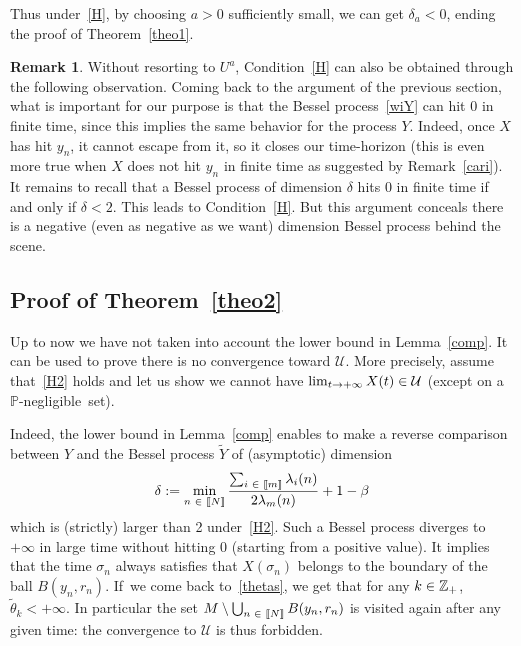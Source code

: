 \documentclass[10pt]{amsart}
\theoremstyle{definition}\newtheorem{defi}[theo]{Definition}\newtheorem{rema}[theo]{Remark}\newtheorem{exam}[theo]{Example}\newtheorem{exem}[theo]{Example}\newtheorem{nota}[theo]{Notation}
\newcommand{\f}[2]{\frac{#1}{#2}}
\newcommand{\cU}{\mathcal{U}}
\newcommand{\PP}{\mathbb{P}}
\newcommand{\ZZ}{\mathbb{Z}}
\newcommand{\iy}{\infty}
\newcommand{\wi}{\widetilde}
\let\oldin\in
\renewcommand{\in}{\mathchoice{\oldin}{\oldin}{\,\oldin\,}{\,\oldin\,}}
\renewcommand*{\to}{\mathchoice{\longrightarrow}{\rightarrow}{\rightarrow}{\rightarrow}}
\newcommand{\llbracket}{\mathopen{[\mkern -2.7mu[}}
\newcommand{\rrbracket}{\mathclose{]\mkern -2.7mu]}}
\newcommand{\lin}{\llbracket}
\newcommand{\rin}{\rrbracket}
\begin{document}
Thus under~\eqref{H}, by choosing $a>0$ sufficiently small, we can get $\delta_a<0$, ending the proof of Theorem~\ref{theo1}.



\begin{rema}
Without resorting to $U^a$, Condition~\eqref{H} can also be obtained through the following observation. Coming back to the argument of the previous section, what is important for our purpose is that the Bessel process~\eqref{wiY} can hit 0 in finite time, since this implies the same behavior for the process $Y$. Indeed, once $X$ has hit $y_n$, it cannot escape from it, so it closes our time-horizon (this is even more true when $X$ does not hit $y_n$ in finite time as suggested by Remark~\ref{cari}). It remains to recall that a Bessel process of dimension $\delta$ hits 0 in finite time if and only if $\delta<2$. This leads to Condition~\eqref{H}. But this argument conceals there is a negative (even as negative as we want) dimension Bessel process behind the scene.
\end{rema}


\subsection{Proof of Theorem~\ref{theo2}}

Up to now we have not taken into account the lower bound in Lemma~\ref{comp}. It can be used to prove there is no convergence toward $\cU$. More precisely, assume that~\eqref{H2} holds and let us show we cannot have $\lim_{t\to +\iy} X(t)\in \cU$ (except on a $\PP$-negligible~set).


Indeed, the lower bound in Lemma~\ref{comp} enables to make a reverse comparison between $Y$ and the Bessel process $\wi Y$ of (asymptotic) dimension
\begin{equation*}
\delta := 
\min_{n\in\lin N\rin}\f{\sum_{i\in\lin m\rin}\lambda_i(n)}{2\lambda_m(n)}+1-\beta
\end{equation*}
which is (strictly) larger than 2 under~\eqref{H2}. Such a Bessel process diverges to $+\iy$ in large time without hitting 0 (starting from a positive value). It implies that the time $\sigma_n$ always satisfies that $X(\sigma_n)$ belongs to the boundary of the ball $B(y_n,r_n)$. If~we come back to~\eqref{thetas}, we get that for any $k\in\ZZ_+$, $\wi\theta_k<+\iy$. In particular the set $M\setminus\bigcup_{n\in\lin N\rin} B(y_n,r_n)$ is visited again after any given time: the convergence to $\cU$ is thus forbidden.
\end{document}
